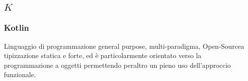 \subsection*{\quad$K\quad$}

\subsubsection*{Kotlin}
Linguaggio di programmazione general purpose, multi-paradigma, Open-Source\glosp a tipizzazione statica e forte, ed è particolarmente orientato verso la programmazione a oggetti permettendo peraltro un pieno uso dell'approccio funzionale.